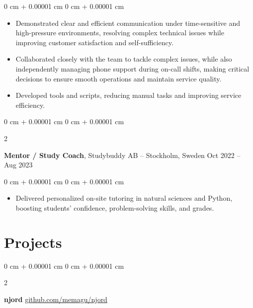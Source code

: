\documentclass[10pt, letterpaper]{article}
\newenvironment{highlights}{
    \begin{itemize}[
        topsep=0.10 cm,
        parsep=0.10 cm,
        partopsep=0pt,
        itemsep=0pt,
        leftmargin=0 cm + 10pt
    ]
}{
    \end{itemize}
} %
\newenvironment{onecolentry}{
    \begin{adjustwidth}{
        0 cm + 0.00001 cm
    }{
        0 cm + 0.00001 cm
    }
}{
    \end{adjustwidth}
} %
\newenvironment{twocolentry}[2][]{
    \onecolentry
    \def\secondColumn{#2}
    \setcolumnwidth{\fill, 4.5 cm}
    \begin{paracol}{2}
}{
    \switchcolumn \raggedleft \secondColumn
    \end{paracol}
    \endonecolentry
} %
\begin{document}
        \vspace{0.10 cm}
        \begin{onecolentry}
            \begin{highlights}
                \item Demonstrated clear and efficient communication under time-sensitive and high-pressure environments, resolving complex technical issues while improving customer satisfaction and self-sufficiency.
                \item Collaborated closely with the team to tackle complex issues, while also independently managing phone support during on-call shifts, making critical decisions to ensure smooth operations and maintain service quality.
                \item Developed tools and scripts, reducing manual tasks and improving service efficiency.
            \end{highlights}
        \end{onecolentry}


        \vspace{0.2 cm}

        \begin{twocolentry}{
            Oct 2022 – Aug 2023
        }
            \textbf{Mentor / Study Coach}, Studybuddy AB -- Stockholm, Sweden\end{twocolentry}

        \vspace{0.10 cm}
        \begin{onecolentry}
            \begin{highlights}
                \item Delivered personalized on-site tutoring in natural sciences and Python, boosting students' confidence, problem-solving skills, and grades.
            \end{highlights}
        \end{onecolentry}



    
    \section{Projects}



        
        \begin{twocolentry}{
            \href{https://github.com/memagu/njord}{github.com/memagu/njord}
        }
            \textbf{njord}\end{twocolentry}
\end{document}
